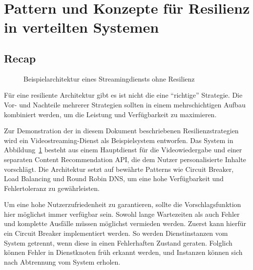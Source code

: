 \section{Pattern und Konzepte für Resilienz in verteilten Systemen}








\subsection{Recap}

\begin{figure}[t]
  \centering
  \resizebox{.8\linewidth}{!}{
  	
  }
  \caption{Beispielarchitektur eines Streamingdiensts ohne Resilienz}
    \label{fig:example-arch}
\end{figure}


		
Für eine resiliente Architektur gibt es ist nicht die eine \enquote{richtige} Strategie. Die Vor- und Nachteile mehrerer Strategien sollten in einem mehrschichtigen Aufbau kombiniert werden, um die Leistung und Verfügbarkeit zu maximieren.

Zur Demonstration der in diesem Dokument beschriebenen Resilienzstrategien wird ein Videostreaming-Dienst als Beispielsystem entworfen. Das System in Abbildung~\ref{fig:example-arch} besteht aus einem Hauptdienst für die Videowiedergabe und einer separaten Content Recommendation API, die dem Nutzer personalisierte Inhalte vorschlägt. Die Architektur setzt auf bewährte Patterns wie Circuit Breaker, Load Balancing und Round Robin DNS, um eine hohe Verfügbarkeit und Fehlertoleranz zu gewährleisten.

Um eine hohe Nutzerzufriedenheit zu garantieren, sollte die Vorschlagsfunktion hier möglichst immer verfügbar sein. Sowohl lange Wartezeiten als auch Fehler und komplette Ausfälle müssen möglichst vermieden werden. Zuerst kann hierfür ein Circuit Breaker implementiert werden. So werden Dienstinstanzen vom System getrennt, wenn diese in einen Fehlerhaften Zustand geraten. Folglich können Fehler in Dienstknoten früh erkannt werden, und Instanzen können sich nach Abtrennung vom System erholen.

